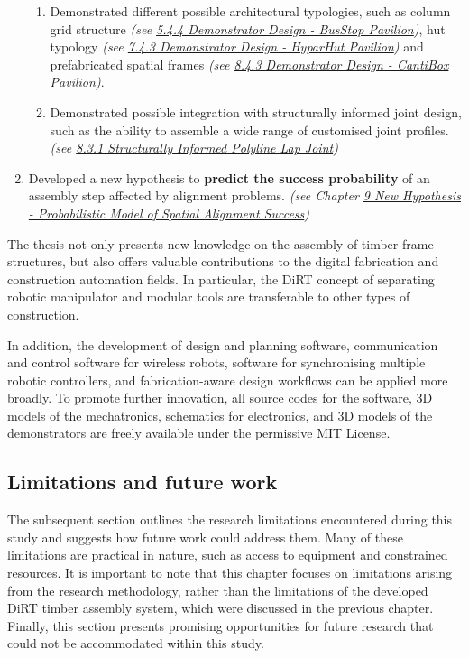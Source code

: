 \documentclass[11pt]{book}
\begin{document}
\begin{enumerate}
\begin{enumerate}
	\item Demonstrated different possible architectural typologies, such as column grid structure \textit{(see \uline{5.4.4 Demonstrator Design - BusStop Pavilion})}, hut typology \textit{(see \uline{7.4.3 Demonstrator Design  - HyparHut Pavilion}) }and prefabricated spatial frames \textit{(see \uline{8.4.3 Demonstrator Design  - CantiBox Pavilion})}.

	\item Demonstrated possible integration with structurally informed joint design, such as the ability to assemble a wide range of customised joint profiles. \textit{(see \uline{8.3.1 Structurally Informed Polyline Lap Joint})}

\end{enumerate}
	\item Developed a new hypothesis to \textbf{predict the success probability} of an assembly step affected by alignment problems. \textit{(see Chapter \uline{9 New Hypothesis - Probabilistic Model of Spatial Alignment Success})}

\end{enumerate}
The thesis not only presents new knowledge on the assembly of timber frame structures, but also offers valuable contributions to the digital fabrication and construction automation fields. In particular, the DiRT concept of separating robotic manipulator and modular tools are transferable to other types of construction. 

In addition, the development of design and planning software, communication and control software for wireless robots, software for synchronising multiple robotic controllers, and fabrication-aware design workflows can be applied more broadly. To promote further innovation, all source codes for the software, 3D models of the mechatronics, schematics for electronics, and 3D models of the demonstrators are freely available under the permissive MIT License. 

\subsection{Limitations and future work}

The subsequent section outlines the research limitations encountered during this study and suggests how future work could address them. Many of these limitations are practical in nature, such as access to equipment and constrained resources. It is important to note that this chapter focuses on limitations arising from the research methodology, rather than the limitations of the developed DiRT timber assembly system, which were discussed in the previous chapter. Finally, this section presents promising opportunities for future research that could not be accommodated within this study.
\end{document}
